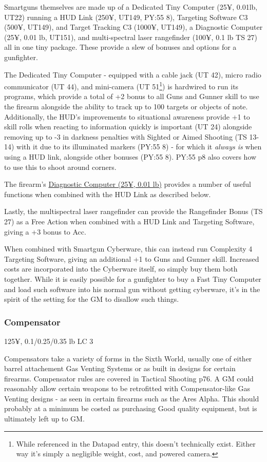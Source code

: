 Smartguns themselves are made up of a Dedicated Tiny Computer (25¥, 0.01lb, UT22) running a HUD Link (250¥, UT149, PY:55 8), Targeting Software C3 (500¥, UT149), and Target Tracking C3 (1000¥, UT149), a Diagnostic Computer (25¥, 0.01 lb, UT151), and multi-spectral laser rangefinder (100¥, 0.1 lb TS 27) all in one tiny package. These provide a slew of bonuses and options for a gunfighter. 

The Dedicated Tiny Computer - equipped with a cable jack (UT 42), micro radio communicator (UT 44), and mini-camera (UT 51\footnote{While referenced in the Datapad entry, this doesn't technically exist. Either way it's simply a negligible weight, cost, and powered camera.}) is hardwired to run its programs, which provide a total of +2 bonus to all Guns and Gunner skill to use the firearm alongside the ability to track up to 100 targets or objects of note. Additionally, the HUD's improvements to situational awareness provide +1 to skill rolls when reacting to information quickly is important (UT 24) alongside removing up to -3 in darkness penalties with Sighted or Aimed Shooting (TS 13-14) with it due to its illuminated markers (PY:55 8) - for which it \textit{always is} when using a HUD link, alongside other bonuses (PY:55 8). PY:55 p8 also covers how to use this to shoot around corners.

The firearm's \hyperref[diagnostic_computer]{Diagnostic Computer (25¥, 0.01 lb)} provides a number of useful functions when combined with the HUD Link as described below.

Lastly, the multispectral laser rangefinder can provide the Rangefinder Bonus (TS 27) as a Free Action when combined with a HUD Link and Targeting Software, giving a +3 bonus to Acc.

When combined with Smartgun Cyberware, this can instead run Complexity 4 Targeting Software, giving an additional +1 to Guns and Gunner skill. Increased costs are incorporated into the Cyberware itself, so simply buy them both together. While it is easily possible for a gunfighter to buy a Fast Tiny Computer and load such software into his normal gun without getting cyberware, it's in the spirit of the setting for the GM to disallow such things. 

\subsubsection{Compensator}
125¥, 0.1/0.25/0.35 lb LC 3

Compensators take a variety of forms in the Sixth World, usually one of either barrel attachement Gas Venting Systems or as built in designs for certain firearms. Compensator rules are covered in Tactical Shooting p76. A GM could reasonably allow certain weapons to be retrofitted with Compensator-like Gas Venting designs - as seen in certain firearms such as the Ares Alpha. This should probably at a minimum be costed as purchasing Good quality equipment, but is ultimately left up to GM.

